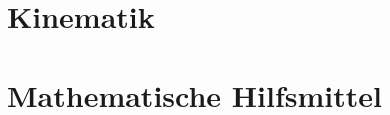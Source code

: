 \documentclass[a4paper, 12pt]{book}
\begin{document}
\tableofcontents

\chapter{Kinematik}








%








\chapter{Mathematische Hilfsmittel}








\end{document}
